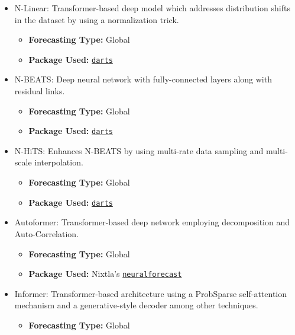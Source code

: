 \documentclass{article}
\begin{document}
\begin{itemize}
\begin{itemize}
    \end{itemize}
    \item N-Linear: Transformer-based deep model which addresses distribution shifts in the dataset by using a normalization trick\cite{Zeng2022}.
    \begin{itemize}
        \item \textbf{Forecasting Type: }Global
        \item \textbf{Package Used: }\texttt{\href{https://unit8co.github.io/darts/generated_api/darts.models.forecasting.nlinear.html}{darts}}
    \end{itemize}
    \item N-BEATS: Deep neural network with fully-connected layers along with residual links\cite{Oreshkin2020}.
    \begin{itemize}
        \item \textbf{Forecasting Type: }Global
        \item \textbf{Package Used: }\texttt{\href{https://unit8co.github.io/darts/generated_api/darts.models.forecasting.nbeats.html}{darts}}
    \end{itemize}
    \item N-HiTS: Enhances N-BEATS by using multi-rate data sampling and multi-scale interpolation\cite{Challu2022}.
    \begin{itemize}
        \item \textbf{Forecasting Type: }Global
        \item \textbf{Package Used: }\texttt{\href{https://unit8co.github.io/darts/generated_api/darts.models.forecasting.nhits.html\#darts.models.forecasting.nhits.NHiTSModel}{darts}}
    \end{itemize}
    \item Autoformer: Transformer-based deep network employing decomposition and Auto-Correlation\cite{Wu2021}.
    \begin{itemize}
        \item \textbf{Forecasting Type: }Global
        \item \textbf{Package Used: }Nixtla's \texttt{\href{https://nixtlaverse.nixtla.io/neuralforecast/models.autoformer.html}{neuralforecast}}
    \end{itemize}
    \item Informer: Transformer-based architecture using a ProbSparse self-attention mechanism and a generative-style decoder among other techniques\cite{Zhou2020}.
    \begin{itemize}
        \item \textbf{Forecasting Type: }Global

\end{itemize}
\end{itemize}
\end{document}
